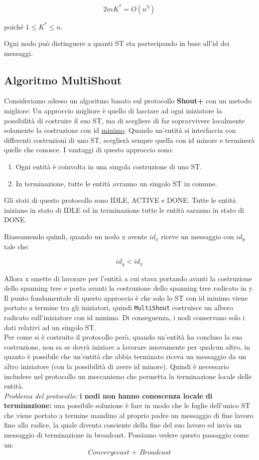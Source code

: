 $$2m K^* = O(n^3)$$

poiché $1 \leq K^* \leq n$. %

Ogni nodo può distinguere a quanti ST sta partecipando in base all'id dei messaggi.

\subsection{Algoritmo MultiShout}
Consideriamo adesso un algoritmo basato sul protocollo \textbf{Shout+} con un metodo migliore:
Un approccio migliore è quello di lasciare ad ogni iniziatore la possibilità di costruire il suo ST, ma di scegliere di far sopravvivere localmente solamente la costruzione con id \underline{minimo}. Quando un'entità si interfaccia con differenti costruzioni di uno ST, sceglierà sempre quella con id minore e terminerà quelle che conosce. I vantaggi di questo approccio sono:
\begin{enumerate}
    \item Ogni entità è coinvolta in una singola costruzione di uno ST.
    \item In terminazione, tutte le entità avranno un singolo ST in comune.
\end{enumerate} 

Gli stati di questo protocollo sono IDLE, ACTIVE e DONE. Tutte le entità iniziano in stato di IDLE ed in terminazione tutte le entità saranno in stato di DONE. 

Riassumendo quindi, quando un nodo x avente $id_x$ riceve un messaggio con $id_y$ tale che:

$$ id_y < id_x$$

Allora x smette di lavorare per l'entità a cui stava portando avanti la costruzione dello spanning tree e porta avanti la costruzione dello spanning tree radicato in y.
Il punto fondamentale di questo approccio è che solo lo ST con id minimo viene portato a termine tra gli iniziatori, quindi \texttt{MultiShout} costruisce un albero radicato sull'iniziatore con id minimo. Di conseguenza, i nodi conservano solo i dati relativi ad un singolo ST.\\
Per come si è costruito il protocollo però, quando un'entità ha concluso la sua costruzione, non sa se dovrà iniziare a lavorare nuovamente per qualcun altro, in quanto è possibile che un'entità che abbia terminato riceva un messaggio da un altro iniziatore (con la possibilità di avere id minore). Quindi è necessario includere nel protocollo un meccanismo che permetta la terminazione locale delle entità.
\\
\textit{Problema del protocollo:} \textbf{i nodi non hanno conoscenza locale di terminazione:} una possibile soluzione è fare in modo che le foglie dell'unico ST che viene portato a termine mandino al proprio padre un messaggio di fine lavoro fino alla radice, la quale diventa cosciente della fine del suo lavoro ed invia un messaggio di terminazione in broadcast. Possiamo vedere questo passaggio come un:
$$\textit{Convergecast + Broadcast}$$


